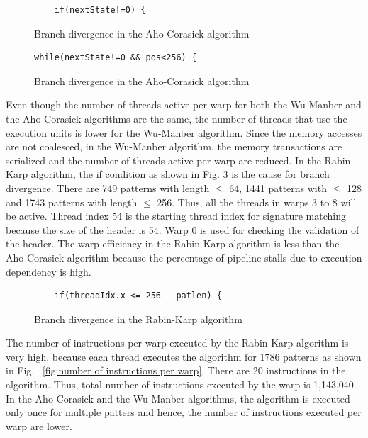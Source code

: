 \begin{figure}[H]
	\centering
	\begin{lstlisting}
	if(nextState!=0) {
	\end{lstlisting}
	\caption{Branch divergence in the Aho-Corasick algorithm}
	\label{fig:ahocorbranchdiv}
\end{figure}
\squeezeup
\begin{figure}[H]
\centering
\begin{lstlisting}
while(nextState!=0 && pos<256) {
\end{lstlisting}
\caption{Branch divergence in the Aho-Corasick algorithm}
\label{fig:ahocorbranchdivfor}
\end{figure}
\squeezeup

Even though the number of threads active per warp for both the Wu-Manber and the Aho-Corasick algorithms are the same, the number of threads that use the execution units is lower for the Wu-Manber algorithm. Since the memory accesses are not coalesced, in the Wu-Manber algorithm, the memory transactions are serialized and the number of threads active per warp are reduced.  In the Rabin-Karp algorithm, the if condition as shown in Fig. \ref{fig:branchdivifrabinkap} is the cause for branch divergence. There are 749 patterns with length \ensuremath{\leq} 64, 1441 patterns with \ensuremath{\leq} 128 and 1743 patterns with length \ensuremath{\leq} 256. Thus, all the threads in warps 3 to 8 will be active. Thread index 54 is the starting thread index for signature matching because the size of the header is 54. Warp 0 is used for checking the validation of the header. The warp efficiency in the Rabin-Karp algorithm is less than the Aho-Corasick algorithm because the percentage of pipeline stalls due to execution dependency is high.

\begin{figure}[H]
	\centering
	\begin{lstlisting}
	if(threadIdx.x <= 256 - patlen) {
	\end{lstlisting}
	\caption{Branch divergence in the Rabin-Karp algorithm}
	\label{fig:branchdivifrabinkap}
\end{figure}
\squeezeup

The number of instructions per warp executed by the Rabin-Karp algorithm is very high, because each thread executes the algorithm for 1786 patterns as shown in Fig. ~\ref{fig:number of instructions per warp}. There are 20 instructions in the algorithm. Thus, total number of instructions executed by the warp is 1,143,040. In the Aho-Corasick and the Wu-Manber algorithms, the algorithm is executed only once for multiple patters and hence, the number of instructions executed per warp are lower.

